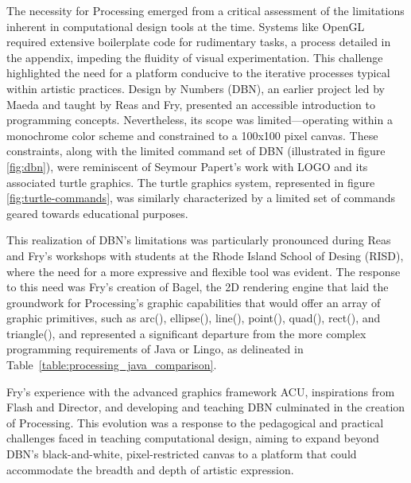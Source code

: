 The necessity for Processing emerged from a critical assessment of the limitations inherent in computational design tools at the time. Systems like OpenGL required extensive boilerplate code for rudimentary tasks, a process detailed in the appendix, impeding the fluidity of visual experimentation. This challenge highlighted the need for a platform conducive to the iterative processes typical within artistic practices.
Design by Numbers (DBN)\parencite{maedaDesignNumbers2001}, an earlier project led by Maeda and taught by Reas and Fry, presented an accessible introduction to programming concepts. Nevertheless, its scope was limited—operating within a monochrome color scheme and constrained to a 100x100 pixel canvas. These constraints, along with the limited command set of DBN (illustrated in figure \ref{fig:dbn}), were reminiscent of Seymour Papert's work with LOGO and its associated turtle graphics. The turtle graphics system, represented in figure \ref{fig:turtle-commands}, was similarly characterized by a limited set of commands geared towards educational purposes.

This realization of DBN's limitations was particularly pronounced during Reas and Fry's workshops with students at the Rhode Island School of Desing (RISD), where the need for a more expressive and flexible tool was evident\parencite{fryModernPrometheusHistory2018}. The response to this need was Fry's creation of Bagel, the 2D rendering engine that laid the groundwork for Processing's graphic capabilities that would offer an array of graphic primitives, such as arc(), ellipse(), line(), point(), quad(), rect(), and triangle(), and represented a significant departure from the more complex programming requirements of Java or Lingo, as delineated in Table~\ref{table:processing_java_comparison}.

Fry's experience with the advanced graphics framework ACU, inspirations from Flash and Director, and developing and teaching DBN culminated in the creation of Processing. This evolution was a response to the pedagogical and practical challenges faced in teaching computational design, aiming to expand beyond DBN's black-and-white, pixel-restricted canvas to a platform that could accommodate the breadth and depth of artistic expression.


